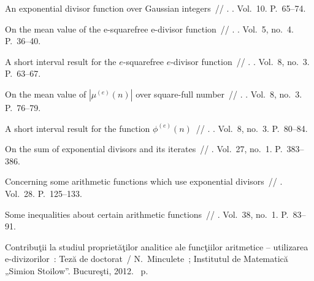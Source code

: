 \documentclass[12pt,a4paper]{article}
\begin{document}
\begin{thebibliography}{10}
 An exponential divisor function over Gaussian
  integers~// . \BibDash
{}. \BibDash
\newblock Vol.~10. \BibDash
\newblock P.~65--74.

 On the mean value of the e-squarefree e-divisor
  function~// . \BibDash
{}. \BibDash
\newblock Vol.~5, no.~4. \BibDash
\newblock P.~36--40.

 A short interval result for the
  $e$-squarefree $e$-divisor function~// . \BibDash
{}. \BibDash
\newblock Vol.~8, no.~3. \BibDash
\newblock P.~63--67.

 On the mean value of $|\mu^{(e)}(n)|$ over
  square-full number~// . \BibDash
{}. \BibDash
\newblock Vol.~8, no.~3. \BibDash
\newblock P.~76--79.

 A short interval result for the function
  $\phi^{(e)}(n)$~// . \BibDash
{}. \BibDash
\newblock Vol.~8, no.~3. \BibDash
\newblock P.~80--84.

 On the sum of exponential divisors and its iterates~//
  \href{http://dx.doi.org/10.1007/BF01224690}{} \BibDash
{}. \BibDash
\newblock Vol.~27, no.~1. \BibDash
\newblock P.~383--386.

 Concerning some arithmetic functions which use
  exponential divisors~// 
  \BibDash
{}. \BibDash
\newblock Vol.~28. \BibDash
\newblock P.~125--133.

 Some inequalities about certain arithmetic functions~//
   \BibDash
{}. \BibDash
\newblock Vol.~38, no.~1. \BibDash
\newblock P.~83--91.

 Contribuţii la studiul proprietăţilor analitice ale
  funcţiilor aritmetice -- utilizarea e-divizorilor~: Teză de doctorat~/
  N.~Minculete~; Institutul de Matematică „Simion Stoilow”. \BibDash
\newblock Bucureşti, 2012. \BibDash
{}~p.


\end{thebibliography}
\end{document}
